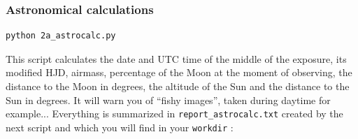 % 
% 
% 
% 


\subsubsection{Astronomical calculations}

\begin{Verbatim}
python 2a_astrocalc.py
\end{Verbatim}

This script calculates the date and UTC time of the middle of the exposure, its modified HJD, airmass, percentage of the Moon at the moment of observing, the distance to the Moon in degrees, the altitude of the Sun and the distance to the Sun in degrees. It will warn you of ``fishy images'', taken during daytime for example...
Everything is summarized in \verb+report_astrocalc.txt+ created by the next script and which you will find in your \verb+workdir+ :

